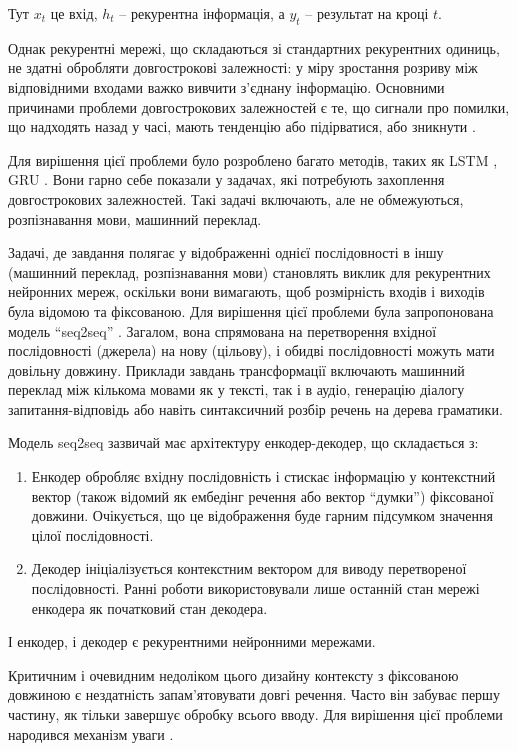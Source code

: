 \documentclass[a4paper,14pt]{extreport}
\begin{document}
Тут $x_t$ це вхід, $h_t$ -- рекурентна інформація, а $y_t$ -- 
результат на кроці $t$.

Однак рекурентні мережі, що складаються зі стандартних рекурентних
одиниць, не здатні обробляти довгострокові залежності: у міру
зростання розриву між відповідними входами важко
вивчити з'єднану інформацію. Основними причинами проблеми
довгострокових залежностей є те, що сигнали про помилки,
що надходять назад у часі, мають тенденцію або підірватися,
або зникнути \cite{nn:recurrent-hard}.

Для вирішення цієї проблеми було розроблено багато
методів, таких як LSTM \cite{nn:lstm}, GRU \cite{nn:gru}. Вони
гарно себе показали у задачах, які потребують захоплення
довгострокових залежностей. Такі задачі включають, але не обмежуються,
розпізнавання мови, машинний переклад.

Задачі, де завдання полягає у відображенні однієї послідовності в
іншу (машинний переклад, розпізнавання мови) становлять
виклик для рекурентних
нейронних мереж, оскільки вони вимагають, щоб розмірність
входів і виходів була відомою та фіксованою.
Для вирішення цієї проблеми була запропонована
модель ``seq2seq'' \cite{nn:seq2seq}. Загалом, вона спрямована
на перетворення вхідної послідовності (джерела) на нову (цільову),
і обидві послідовності можуть мати довільну довжину.
Приклади завдань трансформації включають машинний переклад
між кількома мовами як у тексті, так і в аудіо,
генерацію діалогу запитання-відповідь або навіть синтаксичний
розбір речень на дерева граматики.

Модель seq2seq зазвичай має архітектуру енкодер-декодер, що складається з:

\begin{enumerate}[label=--]
    \item Енкодер обробляє вхідну послідовність і стискає інформацію
    у контекстний вектор (також відомий як ембедінг речення
    або вектор ``думки'') фіксованої довжини. Очікується,
    що це відображення буде гарним підсумком значення
    цілої послідовності.
    \item Декодер ініціалізується контекстним вектором для
    виводу перетвореної послідовності. Ранні роботи
    використовували лише останній стан мережі
    енкодера як початковий стан декодера.
\end{enumerate}

І енкодер, і декодер є рекурентними нейронними мережами.

Критичним і очевидним недоліком цього дизайну контексту з
фіксованою довжиною є нездатність запам'ятовувати довгі речення.
Часто він забуває першу частину, як тільки завершує обробку всього
вводу. Для вирішення цієї проблеми народився
механізм уваги \cite{nn:attention}.
\end{document}
